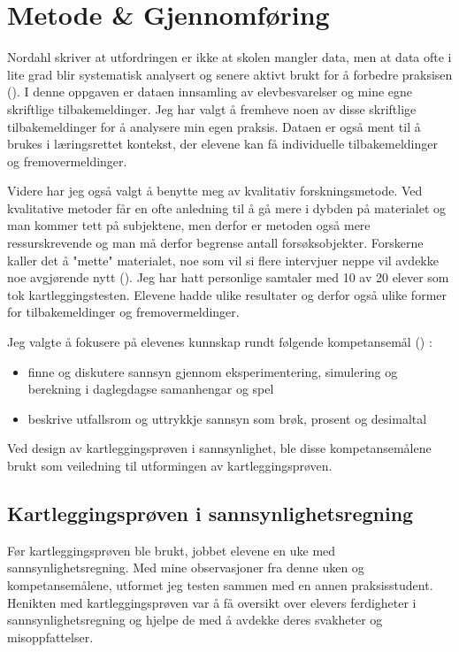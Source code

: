\documentclass[main.tex]{subfiles}
\begin{document}
\section*{Metode \& Gjennomføring}
\label{sec:2}

Nordahl skriver at utfordringen er ikke at skolen mangler data, men at data ofte i lite grad blir
systematisk analysert og senere aktivt brukt for å forbedre praksisen ().
I denne oppgaven er dataen innsamling av elevbesvarelser og mine egne skriftlige tilbakemeldinger.
Jeg har valgt å fremheve noen av disse skriftlige tilbakemeldinger for å analysere min egen praksis.
Dataen er også ment til å brukes i læringsrettet kontekst, der elevene kan få individuelle 
tilbakemeldinger og fremovermeldinger. 

Videre har jeg også valgt å benytte meg av kvalitativ forskningsmetode. Ved kvalitative metoder 
får en ofte anledning til å gå mere i dybden på materialet og man kommer tett på subjektene, men derfor er metoden også 
mere ressurskrevende og man må derfor begrense antall forsøksobjekter. Forskerne kaller det å "mette" materialet, noe som 
vil si flere intervjuer neppe vil avdekke noe avgjørende nytt (). Jeg har hatt personlige samtaler med 10 
av 20 elever som tok kartleggingstesten. Elevene hadde ulike resultater og derfor også ulike former for tilbakemeldinger 
og fremovermeldinger.

Jeg valgte å fokusere på elevenes kunnskap rundt følgende kompetansemål \newline
() :
\begin{itemize}
\item finne og diskutere sannsyn gjennom eksperimentering, simulering og berekning i daglegdagse samanhengar og spel
\item beskrive utfallsrom og uttrykkje sannsyn som brøk, prosent og desimaltal
\end{itemize}
Ved design av kartleggingsprøven i sannsynlighet, ble disse kompetansemålene brukt som veiledning til utformingen av 
kartleggingsprøven.

\subsection*{Kartleggingsprøven i sannsynlighetsregning}

Før kartleggingsprøven ble brukt, jobbet elevene en uke med sannsynlighetsregning. Med mine observasjoner fra denne uken 
og kompetansemålene, utformet jeg testen sammen med en annen praksisstudent. Henikten med kartleggingsprøven 
var å få oversikt over elevers ferdigheter i sannsynlighetsregning og hjelpe de med å avdekke deres
svakheter og misoppfattelser. 
\newline
\end{document}
